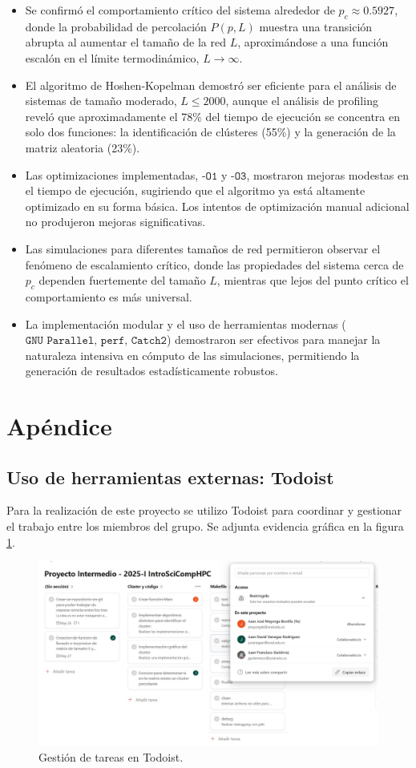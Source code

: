 \documentclass[12pt,a4paper]{article}
\begin{document}
\begin{itemize}
    \item Se confirmó el comportamiento crítico del sistema alrededor de $p_c \approx 0.5927$, donde la probabilidad de percolación $P(p,L)$ muestra una transición abrupta al aumentar el tamaño de la red $L$, aproximándose a una función escalón en el límite termodinámico, $L \rightarrow \infty$.

    \item El algoritmo de Hoshen-Kopelman demostró ser eficiente para el análisis de sistemas de tamaño moderado, $L \leq 2000$, aunque el análisis de profiling reveló que aproximadamente el 78\% del tiempo de ejecución se concentra en solo dos funciones: la identificación de clústeres (55\%) y la generación de la matriz aleatoria (23\%).

    \item Las optimizaciones implementadas, $\texttt{-O1}$ y $\texttt{-O3}$, mostraron mejoras modestas en el tiempo de ejecución, sugiriendo que el algoritmo ya está altamente optimizado en su forma básica. Los intentos de optimización manual adicional no produjeron mejoras significativas.

    \item Las simulaciones para diferentes tamaños de red permitieron observar el fenómeno de escalamiento crítico, donde las propiedades del sistema cerca de $p_c$ dependen fuertemente del tamaño $L$, mientras que lejos del punto crítico el comportamiento es más universal.

    \item La implementación modular y el uso de herramientas modernas ($\texttt{GNU Parallel, perf, Catch2}$) demostraron ser efectivos para manejar la naturaleza intensiva en cómputo de las simulaciones, permitiendo la generación de resultados estadísticamente robustos.
\end{itemize}

\section{Apéndice}

\subsection{Uso de herramientas externas: Todoist}
Para la realización de este proyecto se utilizo Todoist para coordinar y gestionar el trabajo entre los miembros del grupo. Se adjunta evidencia gráfica en la figura \ref{fig:7}.

\begin{figure}[H]
    \centering
    \includegraphics[width=0.9\linewidth]{../figures/todoist.png}
    \caption{Gestión de tareas en Todoist.}
    \label{fig:7}
\end{figure}



\end{document}
